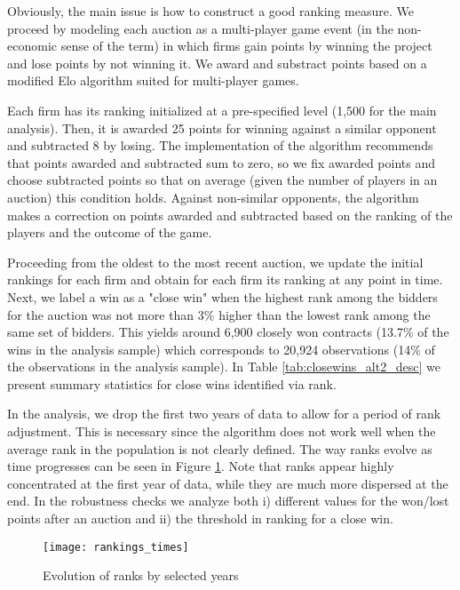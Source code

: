 Obviously, the main issue is how to construct a good ranking measure. We proceed by  modeling each auction as a multi-player game event (in the non-economic sense of the term) in which firms gain points by winning the project and lose points by not winning it. We award and substract points based on a modified Elo algorithm suited for multi-player games.

Each firm has its ranking initialized at a pre-specified level (1,500 for the main analysis). Then, it is awarded 25 points for winning against a similar opponent and subtracted 8 by losing. The implementation of the algorithm recommends that points awarded and subtracted sum to zero, so we fix awarded points and choose subtracted points so that on average (given the number of players in an auction) this condition holds. Against non-similar opponents, the algorithm makes a correction on points awarded and subtracted based on the ranking of the players and the outcome of the game.

Proceeding from the oldest to the most recent auction, we update the initial rankings for each firm and obtain for each firm its ranking at any point in time. Next, we label a win as a "close win" when the highest rank among the bidders for the auction was not more than 3\% higher than the lowest rank among the same set of bidders. This yields around  6,900 closely won contracts (13.7\% of the wins in the analysis sample) which corresponds to 20,924 observations (14\% of the observations in the analysis sample). In Table \ref{tab:closewins_alt2_desc} we present summary statistics for close wins identified via rank.



In the analysis, we drop the first two years of data to allow for a period of rank adjustment. This is necessary since the algorithm does not work well when the average rank in the population is not clearly defined. The way ranks evolve as time progresses  can be seen in Figure \ref{fig:rankings_times}. Note that ranks appear highly concentrated at the first year of data, while they are much more dispersed at the end. In the robustness checks we analyze both i) different values for the won/lost points after an auction and ii) the threshold in ranking for a close win.

\begin{figure}
  \texttt{[image: rankings\_times]}
  \caption{Evolution of ranks by selected years}
  \label{fig:rankings_times}
  \vskip 0.5mm
  { \footnotesize \underline{ } \par}
\end{figure}

